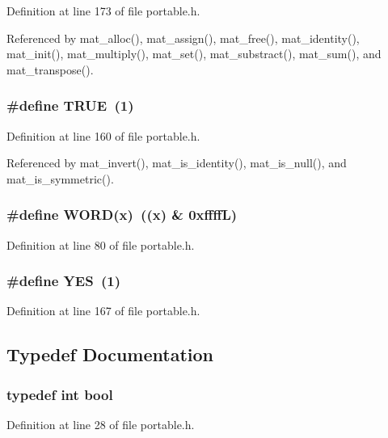 Definition at line 173 of file portable.h.

Referenced by mat\_\-alloc(), mat\_\-assign(), mat\_\-free(), mat\_\-identity(), mat\_\-init(), mat\_\-multiply(), mat\_\-set(), mat\_\-substract(), mat\_\-sum(), and mat\_\-transpose().
\subsubsection{\setlength{\rightskip}{0pt plus 5cm}\#define TRUE\ (1)}\label{portable_8h_a58}




Definition at line 160 of file portable.h.

Referenced by mat\_\-invert(), mat\_\-is\_\-identity(), mat\_\-is\_\-null(), and mat\_\-is\_\-symmetric().
\subsubsection{\setlength{\rightskip}{0pt plus 5cm}\#define WORD(x)\ ((x) \& 0xffff\-L)}\label{portable_8h_a8}




Definition at line 80 of file portable.h.
\subsubsection{\setlength{\rightskip}{0pt plus 5cm}\#define YES\ (1)}\label{portable_8h_a60}




Definition at line 167 of file portable.h.

\subsection{Typedef Documentation}
\subsubsection{\setlength{\rightskip}{0pt plus 5cm}typedef int bool}\label{portable_8h_a72}




Definition at line 28 of file portable.h.
